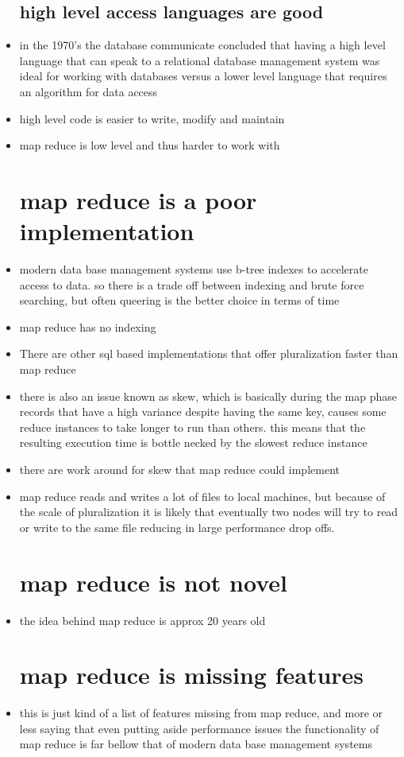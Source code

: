 \documentclass{article}
\begin{document}
\begin{itemize}
\subsection{high level access languages are good}
\item in the 1970's the database communicate concluded that having a high level language that can speak to a relational database management system was ideal for working with databases versus a lower level language that requires an algorithm for data access
\item high level code is easier to write, modify and maintain
\item map reduce is low level and thus harder to work with
\section{map reduce is a poor implementation}
\item modern data base management systems use b-tree indexes to accelerate access to data. so there is a trade off between indexing and brute force searching, but often queering is the better choice in terms of time 
\item map reduce has no indexing 
\item There are other sql based implementations that offer pluralization faster than map reduce
\item  there is also an issue known as skew, which is basically during the map phase records that have a high variance despite having the same key, causes some reduce instances to take longer to run than others. this means that the resulting execution time is bottle necked by the slowest reduce instance 
\item there are work around for skew that map reduce could implement
\item map reduce reads and writes a lot of files to local machines, but because of the scale of pluralization it is likely that eventually two nodes will try to read or write to the same file reducing in large performance drop offs. 
\section{map reduce is not novel}
\item the idea behind map reduce is approx 20 years old 
\section{map reduce is missing features}
\item this is just kind of a list of features missing from map reduce, and more or less saying that even putting aside performance issues the functionality of map reduce is far bellow that of modern data base management systems

\end{itemize}
\end{document}
